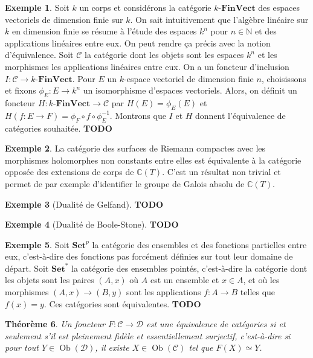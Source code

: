 \documentclass{article}
\newcommand{\N}{\mathbb{N}}
\newcommand{\C}{\mathbb{C}}
\newcommand{\cat}{\mathcal{C}}
\newcommand{\catt}{\mathcal{D}}
\newcommand{\Set}{\mathbf{Set}}
\newcommand{\FinVectcat}{\mathbf{FinVect}}
\DeclareMathOperator{\Ob}{Ob}
\newcommand{\todo}{\textbf{TODO}}
\theoremstyle{plain}
\newtheorem{theorem}{Théorème}[subsection]
\theoremstyle{definition}
\newtheorem{example}[theorem]{Exemple}
\theoremstyle{remark}
\begin{document}
\begin{example}
    Soit $k$ un corps et considérons la catégorie $k\text{-}\FinVectcat$ des espaces vectoriels de dimension finie sur $k$. On sait intuitivement que l'algèbre linéaire sur $k$ en dimension finie se résume à l'étude des espaces $k^n$ pour $n \in \N$ et des applications linéaires entre eux. On peut rendre ça précis avec la notion d'équivalence. Soit $\cat$ la catégorie dont les objets sont les espaces $k^n$ et les morphismes les applications linéaires entre eux. On a un foncteur d'\og inclusion\fg $I : \cat \to k\text{-}\FinVectcat$. Pour $E$ un $k$-espace vectoriel de dimension finie $n$, choisissons et fixons $\phi_E : E \to k^n$ un isomorphisme d'espaces vectoriels. Alors, on définit un foncteur $H : k\text{-}\FinVectcat \to \cat$ par $H(E) = \phi_E(E)$ et $H(f : E \to F) = \phi_F \circ f \circ \phi_E^{-1}$. Montrons que $I$ et $H$ donnent l'équivalence de catégories souhaitée. \todo
\end{example}

\begin{example}
    La catégorie des surfaces de Riemann compactes avec les morphismes holomorphes non constants entre elles est équivalente à la catégorie opposée des extensions de corps de $\C(T)$. C'est un résultat non trivial et permet de par exemple d'identifier le groupe de Galois absolu de $\C(T)$.
\end{example}

\begin{example}[Dualité de Gelfand]
    \todo
\end{example}

\begin{example}[Dualité de Boole-Stone]
    \todo
\end{example}

\begin{example}
    Soit $\Set^p$ la catégorie des ensembles et des fonctions partielles entre eux, c'est-à-dire des fonctions pas forcément définies sur tout leur domaine de départ. Soit $\Set^*$ la catégorie des ensembles pointés, c'est-à-dire la catégorie dont les objets sont les paires $(A,x)$ où $A$ est un ensemble et $x \in A$, et où les morphismes $(A,x) \to (B,y)$ sont les applications $f : A \to B$ telles que $f(x) = y$. Ces catégories sont équivalentes. \todo
\end{example}

\begin{theorem}
    Un foncteur $F : \cat \to \catt$ est une équivalence de catégories si et seulement s'il est pleinement fidèle et \emph{essentiellement surjectif}, c'est-à-dire si pour tout $Y \in \Ob(\catt)$, il existe $X \in \Ob(\cat)$ tel que $F(X) \simeq Y$.
\end{theorem}
\end{document}
